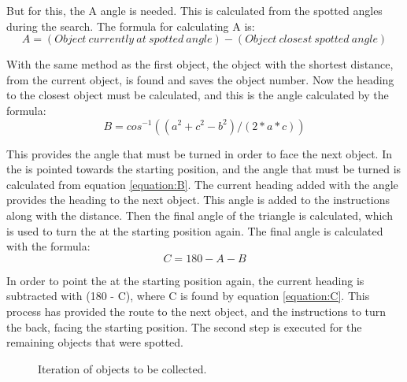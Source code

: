 But for this, the A angle is needed. This is calculated from the spotted angles during the search. The formula for calculating A is:
\begin{equation}
A = (Object~currently~at~spotted~angle) - (Object~closest~spotted~angle) \label{equation:AAngle}
\end{equation}

With the same method as the first object, the object with the shortest distance, from the current object, is found and saves the object number. Now the heading to the closest object must be calculated, and this is the angle calculated by the formula:
\begin{equation}
B = cos^{-1}((a^2 + c^2 - b^2)/(2*a*c)) \label{equation:B}
\end{equation}

This provides the angle that must be turned in order to face the next object. In  the \projname{} is pointed towards the starting position, and the angle that must be turned is calculated from equation \ref{equation:B}. The current heading added with the angle provides the heading to the next object. This angle is added to the instructions along with the distance. Then the final angle of the triangle is calculated, which is used to turn the \projname{} at the starting position again. The final angle is calculated with the formula:
\begin{equation}
C = 180 - A - B \label{equation:C}
\end{equation}

In order to point the \projname{} at the starting position again, the current heading is subtracted with (180 - C), where C is found by equation \ref{equation:C}. This process has provided the route to the next object, and the instructions to turn the \projname{} back, facing the starting position. The second step is executed for the remaining objects that were spotted. 

\begin{figure}[H]
     \caption{\label{fig:object_navigation_iteration} Iteration of objects to be collected.}
\end{figure}



